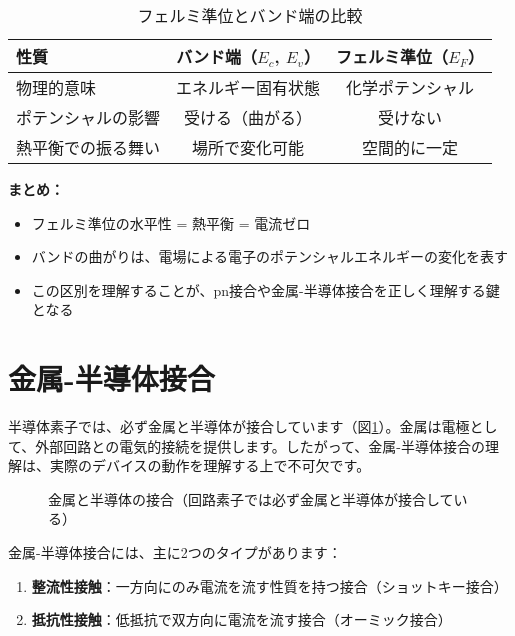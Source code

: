 \begin{table}[H]
\centering
\caption{フェルミ準位とバンド端の比較}
\begin{tabular}{|l|c|c|}
\hline
\textbf{性質} & \textbf{バンド端（$E_c$, $E_v$）} & \textbf{フェルミ準位（$E_F$）} \\
\hline
物理的意味 & エネルギー固有状態 & 化学ポテンシャル \\
\hline
ポテンシャルの影響 & 受ける（曲がる） & 受けない \\
\hline
熱平衡での振る舞い & 場所で変化可能 & 空間的に一定 \\
\hline
\end{tabular}
\end{table}

\textbf{まとめ：}

\begin{itemize}
\item フェルミ準位の水平性 = 熱平衡 = 電流ゼロ
\item バンドの曲がりは、電場による電子のポテンシャルエネルギーの変化を表す
\item この区別を理解することが、pn接合や金属-半導体接合を正しく理解する鍵となる
\end{itemize}


\section{金属-半導体接合}

半導体素子では、必ず金属と半導体が接合しています（図\ref{fig:metal_semiconductor_necessity}）。金属は電極として、外部回路との電気的接続を提供します。したがって、金属-半導体接合の理解は、実際のデバイスの動作を理解する上で不可欠です。

\begin{figure}[H]
\centering
{}
\caption{金属と半導体の接合（回路素子では必ず金属と半導体が接合している）}
\label{fig:metal_semiconductor_necessity}
\end{figure}

金属-半導体接合には、主に2つのタイプがあります：
\begin{enumerate}
\item \textbf{整流性接触}：一方向にのみ電流を流す性質を持つ接合（ショットキー接合）
\item \textbf{抵抗性接触}：低抵抗で双方向に電流を流す接合（オーミック接合）
\end{enumerate}

